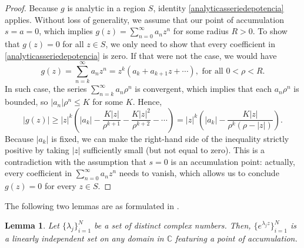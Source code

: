 \documentclass[12pt]{report} %
\newtheorem{lemma}{Lemma}
\begin{document}
\begin{proof}
  Because $g$ is analytic in a region $S$, identity
  \eqref{analyticasseriedepotencia} applies. Without loss of generality, we
  assume that our point of accumulation $s = a = 0$, which implies $g (z) =
  \sum_{n = 0}^{\infty} a_n z^n$ for some radius $R > 0$. To show that $g (z)
  = 0$ for all $z \in S$, we only need to show that every coefficient in
  \eqref{analyticasseriedepotencia} is zero. If that were not the case, we
  would have
  \[ g (z) = \sum_{n = k}^{\infty} a_n z^n = z^k (a_k + a_{k + 1} z + \cdots),
     \text{ for all } 0 < \rho < R. \]
  In such case, the series $\sum_{n = k}^{\infty} a_n \rho^n$ is convergent,
  which implies that each $a_n \rho^n$ is bounded, so $| a_n | \rho^n \leq K$
  for some $K$. Hence,
  \[ | g (z) | \geq | z |^k \left( | a_k | - \frac{K | z |}{\rho^{k + 1}} -
     \frac{K | z |^2}{\rho^{k + 2}} - \cdots \right) = | z |^k \left( | a_k |
     - \frac{K | z |}{\rho^k (\rho - | z |)} \right) . \]
  Because $| a_k |$ is fixed, we can make the right-hand side of the
  inequality strictly positive by taking $| z |$ sufficiently small (but not
  equal to zero). This is a contradiction with the assumption that $s = 0$ is
  an accumulation point: actually, every coefficient in $\sum_{n = 0}^{\infty}
  a_n z^n$ needs to vanish, which allows us to conclude $g (z) = 0$ for every
  $z \in S$.
\end{proof}

The following two lemmas are as formulated in {\cite{cheneylight2009course}}.

\begin{lemma}
  \label{lemma-linearly-independent-set-featuring-accumulation}Let $\{
  \lambda_j \}_{i = 1}^N$ be a set of distinct complex numbers. Then, $\{
  e^{\lambda_j z} \}_{i = 1}^N$ is a linearly independent set on any domain in
  $\mathbb{C}$ featuring a point of accumulation.
\end{lemma}
\end{document}

